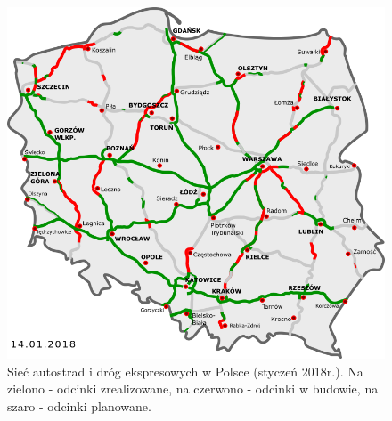 \begin{figure}[h]
\caption{Sieć autostrad i dróg ekspresowych w Polsce (styczeń 2018r.). Na zielono - odcinki zrealizowane, na czerwono - odcinki w budowie, na szaro - odcinki planowane.}
\includegraphics[width=\textwidth]{images/2018.png}
\end{figure}

